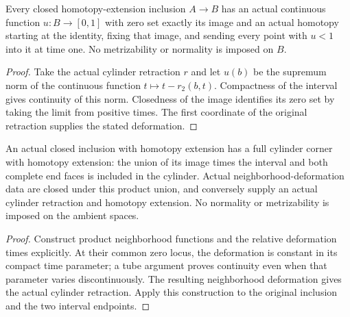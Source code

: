 \begin{proposition}
  \label{prop:actual-closed-hep-neighborhood-deformation}
  \leanok
  Every closed homotopy-extension inclusion $A\to B$ has an actual continuous function $u:B\to[0,1]$ with zero set exactly its image and an actual homotopy starting at the identity, fixing that image, and sending every point with $u<1$ into it at time one. No metrizability or normality is imposed on $B$.
\end{proposition}
\begin{proof}
  Take the actual cylinder retraction $r$ and let $u(b)$ be the supremum norm of the continuous function $t\mapsto t-r_2(b,t)$. Compactness of the interval gives continuity of this norm. Closedness of the image identifies its zero set by taking the limit from positive times. The first coordinate of the original retraction supplies the stated deformation.
  \leanok
\end{proof}

\begin{proposition}
  \label{prop:actual-closed-hep-cylinder-corner}
  \leanok
  An actual closed inclusion with homotopy extension has a full cylinder corner with homotopy extension: the union of its image times the interval and both complete end faces is included in the cylinder. Actual neighborhood-deformation data are closed under this product union, and conversely supply an actual cylinder retraction and homotopy extension. No normality or metrizability is imposed on the ambient spaces.
\end{proposition}
\begin{proof}
  Construct product neighborhood functions and the relative deformation times explicitly. At their common zero locus, the deformation is constant in its compact time parameter; a tube argument proves continuity even when that parameter varies discontinuously. The resulting neighborhood deformation gives the actual cylinder retraction. Apply this construction to the original inclusion and the two interval endpoints.
  \leanok
\end{proof}

